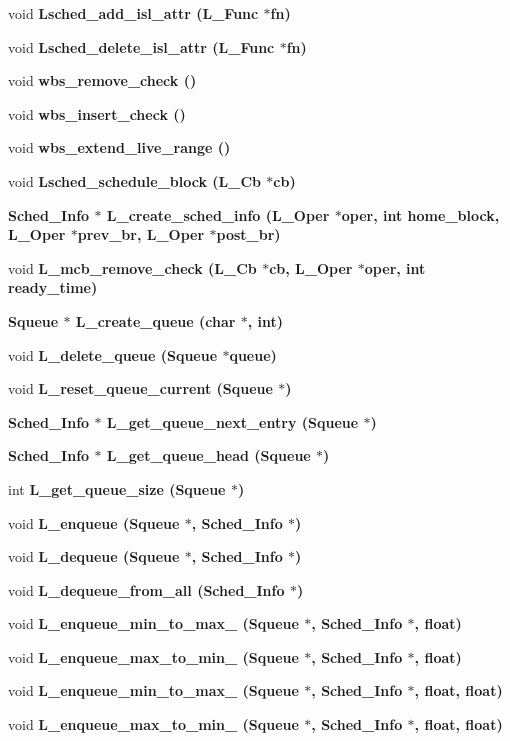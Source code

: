 \begin{CompactItemize}
\item 
void \bf{Lsched\_\-add\_\-isl\_\-attr} (L\_\-Func $\ast$fn)
\item 
void \bf{Lsched\_\-delete\_\-isl\_\-attr} (L\_\-Func $\ast$fn)
\item 
void \bf{wbs\_\-remove\_\-check} ()
\item 
void \bf{wbs\_\-insert\_\-check} ()
\item 
void \bf{wbs\_\-extend\_\-live\_\-range} ()
\item 
void \bf{Lsched\_\-schedule\_\-block} (L\_\-Cb $\ast$cb)
\item 
\bf{Sched\_\-Info} $\ast$ \bf{L\_\-create\_\-sched\_\-info} (L\_\-Oper $\ast$oper, int home\_\-block, L\_\-Oper $\ast$prev\_\-br, L\_\-Oper $\ast$post\_\-br)
\item 
void \bf{L\_\-mcb\_\-remove\_\-check} (L\_\-Cb $\ast$cb, L\_\-Oper $\ast$oper, int ready\_\-time)
\item 
\bf{Squeue} $\ast$ \bf{L\_\-create\_\-queue} (char $\ast$, int)
\item 
void \bf{L\_\-delete\_\-queue} (\bf{Squeue} $\ast$queue)
\item 
void \bf{L\_\-reset\_\-queue\_\-current} (\bf{Squeue} $\ast$)
\item 
\bf{Sched\_\-Info} $\ast$ \bf{L\_\-get\_\-queue\_\-next\_\-entry} (\bf{Squeue} $\ast$)
\item 
\bf{Sched\_\-Info} $\ast$ \bf{L\_\-get\_\-queue\_\-head} (\bf{Squeue} $\ast$)
\item 
int \bf{L\_\-get\_\-queue\_\-size} (\bf{Squeue} $\ast$)
\item 
void \bf{L\_\-enqueue} (\bf{Squeue} $\ast$, \bf{Sched\_\-Info} $\ast$)
\item 
void \bf{L\_\-dequeue} (\bf{Squeue} $\ast$, \bf{Sched\_\-Info} $\ast$)
\item 
void \bf{L\_\-dequeue\_\-from\_\-all} (\bf{Sched\_\-Info} $\ast$)
\item 
void \bf{L\_\-enqueue\_\-min\_\-to\_\-max\_} (\bf{Squeue} $\ast$, \bf{Sched\_\-Info} $\ast$, float)
\item 
void \bf{L\_\-enqueue\_\-max\_\-to\_\-min\_} (\bf{Squeue} $\ast$, \bf{Sched\_\-Info} $\ast$, float)
\item 
void \bf{L\_\-enqueue\_\-min\_\-to\_\-max\_} (\bf{Squeue} $\ast$, \bf{Sched\_\-Info} $\ast$, float, float)
\item 
void \bf{L\_\-enqueue\_\-max\_\-to\_\-min\_} (\bf{Squeue} $\ast$, \bf{Sched\_\-Info} $\ast$, float, float)
\item 

\end{CompactItemize}
